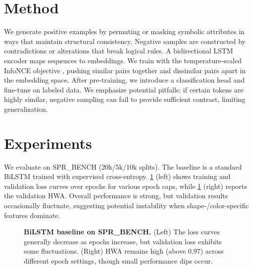 \documentclass{article} %
\theoremstyle{plain}
\theoremstyle{definition}
\theoremstyle{remark}
\begin{document}
\section{Method}
We generate positive examples by permuting or masking symbolic attributes in ways that maintain structural consistency. Negative samples are constructed by contradictions or alterations that break logical rules. A bidirectional LSTM encoder maps sequences to embeddings. We train with the temperature-scaled InfoNCE objective \citep{chen2020asf}, pushing similar pairs together and dissimilar pairs apart in the embedding space. After pre-training, we introduce a classification head and fine-tune on labeled data. We emphasize potential pitfalls: if certain tokens are highly similar, negative sampling can fail to provide sufficient contrast, limiting generalization.

\section{Experiments}
We evaluate on SPR\_BENCH (20k/5k/10k splits). The baseline is a standard BiLSTM trained with supervised cross-entropy. \cref{fig:baseline_figs} (left) shows training and validation loss curves over epochs for various epoch caps, while \cref{fig:baseline_figs} (right) reports the validation HWA. Overall performance is strong, but validation results occasionally fluctuate, suggesting potential instability when shape-/color-specific features dominate.

\begin{figure}[t!]
\centering
{}
\hspace{0.02\textwidth}
\caption{\textbf{BiLSTM baseline on SPR\_BENCH.} (Left) The loss curves generally decrease as epochs increase, but validation loss exhibits some fluctuations. (Right) HWA remains high (above 0.97) across different epoch settings, though small performance dips occur.}
\label{fig:baseline_figs}
\end{figure}
\end{document}
